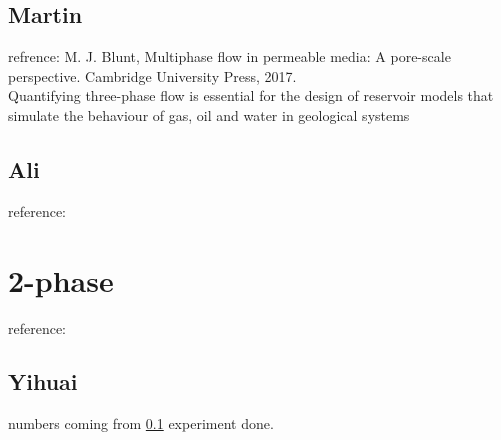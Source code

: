 \documentclass{article}
\begin{document}
\subsection{Martin}\label{martin}
refrence: M. J. Blunt, Multiphase flow in permeable media: A pore-scale perspective. Cambridge University Press, 2017.\\
Quantifying three-phase flow is essential for the design of reservoir models that simulate the behaviour of gas, oil and water in geological systems

\subsection{Ali}
reference: \\

\section{2-phase}
reference: \\

\subsection{Yihuai}
numbers coming from \ref{martin}
experiment done.
\end{document}
